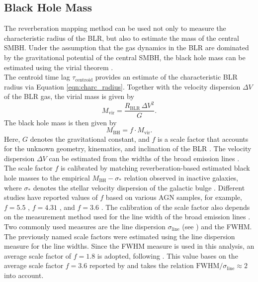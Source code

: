 \subsection{Black Hole Mass}
\label{subsec:BHM}

The reverberation mapping method can be used not only to measure the characteristic radius of the BLR, but also to estimate the mass of the central SMBH. Under the assumption that the gas dynamics in the BLR are dominated by the gravitational potential of the central SMBH, the black hole mass can be estimated using the virial theorem \parencite{peterson2004}.\\  
The centroid time lag $\tau_{\mathrm{centroid}}$ provides an estimate of the characteristic BLR radius via Equation 
\ref{eqn:charc_radius}. 
Together with the velocity dispersion $\Delta V$ of the BLR gas, the virial mass is given by
\begin{equation}
	\label{eqn:M_vir}
	M_{\mathrm{vir}} = \frac{R_{\mathrm{BLR}}\,\Delta V^2}{G}.
\end{equation}
The black hole mass is then given by
\begin{equation}
	\label{eqn:M_BH}
	M_{\mathrm{BH}} = f \cdot M_{\mathrm{vir}}.
\end{equation}
Here, $G$ denotes the gravitational constant, and $f$ is a scale factor that accounts for the unknown geometry, kinematics, and inclination of the BLR \parencite{peterson2004}. The velocity dispersion $\Delta V$ can be estimated from the widths of the broad emission lines \parencite{peterson2004}.\\ 
The scale factor $f$ is calibrated by matching reverberation-based estimated black hole masses to the empirical $M_{\mathrm{BH}}-\sigma_*$ relation observed in inactive galaxies, where $\sigma_*$ denotes the stellar velocity dispersion of the galactic bulge \parencite{onken2004}. Different studies have reported values of $f$ based on various AGN samples, for example, $f = 5.5$ \parencite{onken2004}, $f = 4.31$ \parencite{gier2013a}, and $f = 3.6$ \parencite{graham2011expanded}. The calibration of the scale factor also depends on the measurement method used for the line width of the broad emission lines \parencite{peterson2004}. Two commonly used measures are the line dispersion $\sigma_{\mathrm{line}}$ (see \cite{peterson2004}) and the FWHM. The previously named scale factors were estimated using the line dispersion measure for the line widths. Since the FWHM measure is used in this analysis, an average scale factor of $f = 1.8$ is adopted, following \cite{probst2025emissionlinecontinuumreverberationmapping}. This value bases on the average scale factor $f = 3.6$ reported by \cite{graham2011expanded} and takes the relation $\mathrm{FWHM}/\sigma_{\mathrm{line}} \approx 2$ \parencite{peterson2004} into account.


